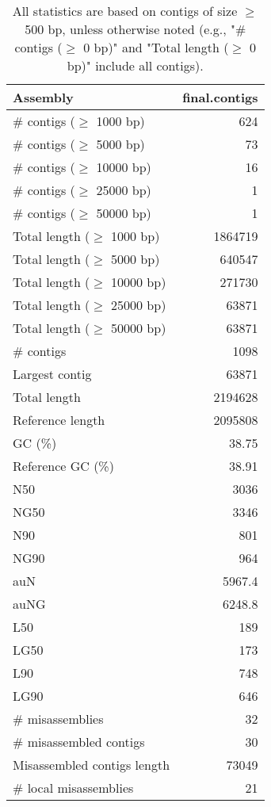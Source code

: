 \documentclass[12pt,a4paper]{article}
\begin{document}
\begin{table}[ht]
\begin{center}
\caption{All statistics are based on contigs of size $\geq$ 500 bp, unless otherwise noted (e.g., "\# contigs ($\geq$ 0 bp)" and "Total length ($\geq$ 0 bp)" include all contigs).}
\begin{tabular}{|l*{1}{|r}|}
\hline
Assembly & final.contigs \\ \hline
\# contigs ($\geq$ 1000 bp) & 624 \\ \hline
\# contigs ($\geq$ 5000 bp) & 73 \\ \hline
\# contigs ($\geq$ 10000 bp) & 16 \\ \hline
\# contigs ($\geq$ 25000 bp) & 1 \\ \hline
\# contigs ($\geq$ 50000 bp) & 1 \\ \hline
Total length ($\geq$ 1000 bp) & 1864719 \\ \hline
Total length ($\geq$ 5000 bp) & 640547 \\ \hline
Total length ($\geq$ 10000 bp) & 271730 \\ \hline
Total length ($\geq$ 25000 bp) & 63871 \\ \hline
Total length ($\geq$ 50000 bp) & 63871 \\ \hline
\# contigs & 1098 \\ \hline
Largest contig & 63871 \\ \hline
Total length & 2194628 \\ \hline
Reference length & 2095808 \\ \hline
GC (\%) & 38.75 \\ \hline
Reference GC (\%) & 38.91 \\ \hline
N50 & 3036 \\ \hline
NG50 & 3346 \\ \hline
N90 & 801 \\ \hline
NG90 & 964 \\ \hline
auN & 5967.4 \\ \hline
auNG & 6248.8 \\ \hline
L50 & 189 \\ \hline
LG50 & 173 \\ \hline
L90 & 748 \\ \hline
LG90 & 646 \\ \hline
\# misassemblies & 32 \\ \hline
\# misassembled contigs & 30 \\ \hline
Misassembled contigs length & 73049 \\ \hline
\# local misassemblies & 21 \\ \hline

\end{tabular}
\end{center}
\end{table}
\end{document}
